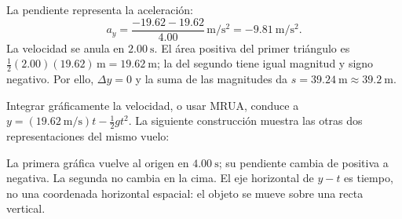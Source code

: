 \begin{explicacion}
La pendiente representa la aceleración:
\[ a_y=\frac{-19.62-19.62}{4.00}\,\si{\meter\per\second\squared}=-\SI{9.81}{\meter\per\second\squared}. \]
La velocidad se anula en \(\SI{2.00}{\second}\). El área positiva del primer triángulo es \(\frac12(2.00)(19.62)\,\si{\meter}=\SI{19.62}{\meter}\); la del segundo tiene igual magnitud y signo negativo. Por ello, \(\Delta y=0\) y la suma de las magnitudes da \(s=\SI{39.24}{\meter}\approx\SI{39.2}{\meter}\).

Integrar gráficamente la velocidad, o usar MRUA, conduce a \(y=(\SI{19.62}{\meter\per\second})t-\frac12gt^2\). La siguiente construcción muestra las otras dos representaciones del mismo vuelo:
\begin{center}

\end{center}
La primera gráfica vuelve al origen en \(\SI{4.00}{\second}\); su pendiente cambia de positiva a negativa. La segunda no cambia en la cima. El eje horizontal de \(y-t\) es tiempo, no una coordenada horizontal espacial: el objeto se mueve sobre una recta vertical.
\end{explicacion}

